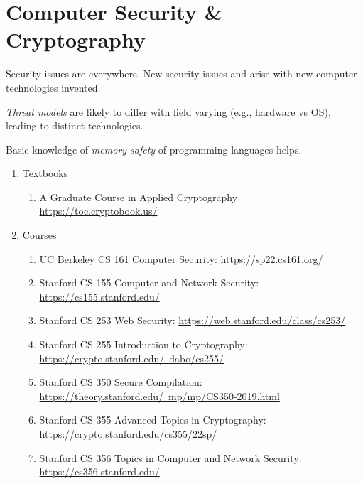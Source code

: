 \documentclass{article}
\begin{document}
\section{Computer Security \& Cryptography}
Security issues are everywhere.
New security issues and arise with new computer technologies invented.

\emph{Threat models} are likely to differ with field varying (e.g., hardware vs OS), leading to distinct technologies.

Basic knowledge of \emph{memory safety} of programming languages helps.

\begin{enumerate}
    \item Textbooks
    \begin{enumerate}
        \item A Graduate Course in
Applied Cryptography\\
        \href{https://toc.cryptobook.us/}{https://toc.cryptobook.us/}
    \end{enumerate}
    \item Courses
    \begin{enumerate}
        \item UC Berkeley CS 161 Computer Security:
        \href{https://sp22.cs161.org/}{https://sp22.cs161.org/}
        \item Stanford CS 155 Computer and Network Security:
        \href{https://cs155.stanford.edu/}{https://cs155.stanford.edu/}
        \item Stanford CS 253 Web Security:
        \href{https://web.stanford.edu/class/cs253/}{https://web.stanford.edu/class/cs253/}
        \item Stanford CS 255 Introduction to Cryptography:
        \href{https://crypto.stanford.edu/~dabo/cs255/}{https://crypto.stanford.edu/~dabo/cs255/}
        \item Stanford CS 350 Secure Compilation:\\
        \href{https://theory.stanford.edu/~mp/mp/CS350-2019.html}{https://theory.stanford.edu/~mp/mp/CS350-2019.html}
        \item Stanford CS 355 Advanced Topics in Cryptography:\\
        \href{https://crypto.stanford.edu/cs355/22sp/}{https://crypto.stanford.edu/cs355/22sp/}
        \item Stanford CS 356 Topics in Computer and Network Security:
        \href{https://cs356.stanford.edu/}{https://cs356.stanford.edu/}    \end{enumerate}


\end{enumerate}
\end{document}
